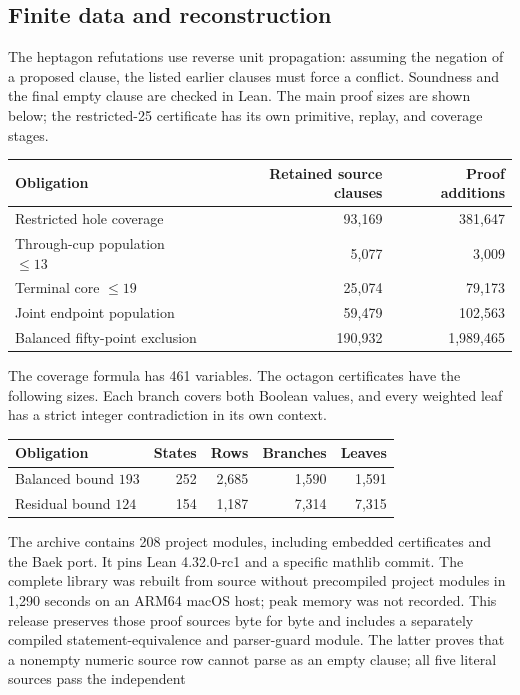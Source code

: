 \subsection{Finite data and reconstruction}
The heptagon refutations use reverse unit propagation: assuming the
negation of a proposed clause, the listed earlier clauses must force a
conflict. Soundness and the final empty clause are checked in Lean.
The main proof sizes are shown below; the restricted-25 certificate
has its own primitive, replay, and coverage stages.
\begin{center}
\small
\begin{tabular}{lrr}
\toprule
Obligation & Retained source clauses & Proof additions\\
\midrule
Restricted hole coverage & 93,169 & 381,647\\
Through-cup population $\le13$ & 5,077 & 3,009\\
Terminal core $\le19$ & 25,074 & 79,173\\
Joint endpoint population & 59,479 & 102,563\\
Balanced fifty-point exclusion & 190,932 & 1,989,465\\
\bottomrule
\end{tabular}
\end{center}
The coverage formula has 461 variables.
The octagon certificates have the following sizes. Each branch covers
both Boolean values, and every weighted leaf has a strict integer
contradiction in its own context.
\begin{center}
\small
\begin{tabular}{lrrrr}
\toprule
Obligation & States & Rows & Branches & Leaves\\
\midrule
Balanced bound $193$ & 252 & 2,685 & 1,590 & 1,591\\
Residual bound $124$ & 154 & 1,187 & 7,314 & 7,315\\
\bottomrule
\end{tabular}
\end{center}
The archive contains 208 project modules, including embedded certificates
and the Baek port. It pins Lean 4.32.0-rc1 and a specific mathlib commit.
The complete library was rebuilt from source without precompiled
project modules in 1,290 seconds on an ARM64 macOS host; peak memory
was not recorded. This release preserves those proof sources byte for
byte and includes a separately compiled statement-equivalence and
parser-guard module. The latter proves that a nonempty numeric source row cannot
parse as an empty clause; all five literal sources pass the independent

